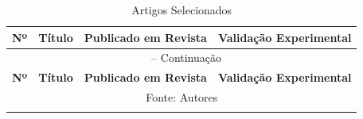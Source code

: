 {\small
\setlength{\tabcolsep}{3pt}%

\begin{longtable}{|p{0.8cm}|p{8cm}|p{3cm}|p{3cm}|}
    \caption{Artigos Selecionados}
    \label{tab:artigos-selecionados} \\
    \hline
    \textbf{Nº} &
    \textbf{Título} &
    \textbf{Publicado em Revista} &
    \textbf{Validação Experimental} \\
    \hline
    \endfirsthead

    \multicolumn{4}{c}{\tablename\ \thetable{} -- Continuação} \\
    \hline
    \textbf{Nº} &
    \textbf{Título} &
    \textbf{Publicado em Revista} &
    \textbf{Validação Experimental} \\
    \hline
    \endhead

    \hline
    \multicolumn{4}{c}{Fonte: Autores} \\
    \endlastfoot


\end{longtable}}
